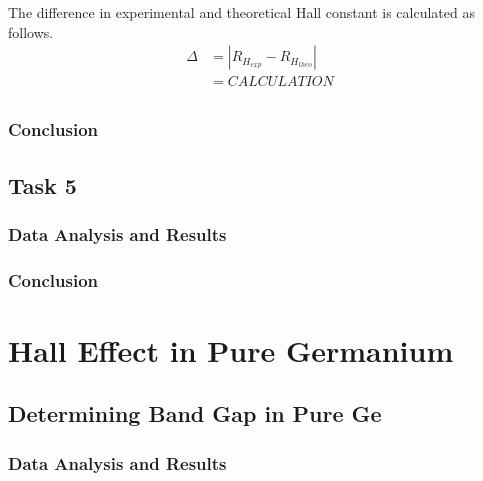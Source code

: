 \documentclass[a4paper]{article}
\begin{document}
The difference in experimental and theoretical Hall constant is calculated as follows.
\begin{align*}
\Delta &= | R_{H_{exp}} - R_{H_{theo}} | \\
	   &= CALCULATION \\
\end{align*}


\subsubsection{Conclusion}

\subsection{Task 5}

\subsubsection{Data Analysis and Results}

\subsubsection{Conclusion}

\newpage

\section{Hall Effect in Pure Germanium}

\subsection{Determining Band Gap in Pure Ge}

\subsubsection{Data Analysis and Results}
\end{document}
